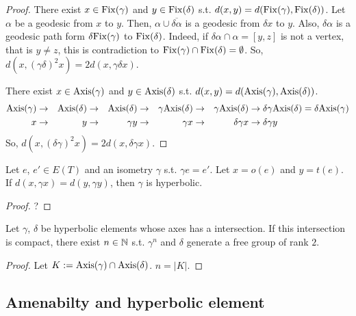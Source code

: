 \begin{proof}
  There exist $x \in {\rm Fix}(\gamma)$ and $y \in {\rm Fix}(\delta)$ s.t. $d(x,y) = d({\rm Fix}(\gamma),{\rm Fix}(\delta))$.
  Let $\alpha$ be a geodesic from $x$ to $y$.
  Then, $\alpha \cup \overline{\delta \alpha}$ is a geodesic from $\delta x$ to $y$.
  Also, $\delta \alpha$ is a geodesic path form $\delta {\rm Fix}(\gamma)$ to ${\rm Fix}(\delta)$.
  Indeed, if $\delta \alpha \cap \alpha = [y,z]$ is not a vertex, that is $y \neq z$, this is contradiction to ${\rm Fix}(\gamma) \cap {\rm Fix}(\delta) = \emptyset$.
  So, $d(x, (\gamma \delta)^2 x) = 2 d(x, \gamma \delta x)$.

  There exist $x \in {\rm Axis}(\gamma)$ and $y \in {\rm Axis}(\delta)$ s.t. $d(x,y) = d({\rm Axis}(\gamma),{\rm Axis}(\delta))$.
  \begin{alignat*}{5}
    {\rm Axis}(\gamma) &\rightarrow& {\rm Axis}(\delta) &\rightarrow& {\rm Axis}(\delta) &\rightarrow& \gamma {\rm Axis}(\delta) &\rightarrow& \gamma {\rm Axis}(\delta) &\rightarrow \delta \gamma {\rm Axis}(\delta) = \delta {\rm Axis}(\gamma)\\
    x &\rightarrow& y &\rightarrow& \gamma y &\rightarrow& \gamma x &\rightarrow& \delta \gamma x &\rightarrow \delta \gamma y
  \end{alignat*}
  So, $d(x,(\delta \gamma)^2 x) = 2d(x,\delta \gamma x)$. 
\end{proof}

\begin{lemma}
  Let $e$, $e' \in E(T)$ and an isometry $\gamma$ s.t. $\gamma e = e'$.
  Let $x = o(e)$ and $y = t(e)$. 
  If $d(x, \gamma x) = d(y, \gamma y)$, then $\gamma$ is hyperbolic.
\end{lemma}

\begin{proof}
  ?
\end{proof}

\begin{lemma}
  Let $\gamma$, $\delta$ be hyperbolic elements whose axes has a intersection.
  If this intersection is compact, there exist $n \in \mathbb{N}$ s.t. $\gamma^n$ and $\delta$ generate a free group of rank $2$.
\end{lemma}

\begin{proof}
  Let $K := {\rm Axis}(\gamma) \cap {\rm Axis}(\delta)$. $n = |K|$.
\end{proof}

\subsection{Amenabilty and hyperbolic element}

